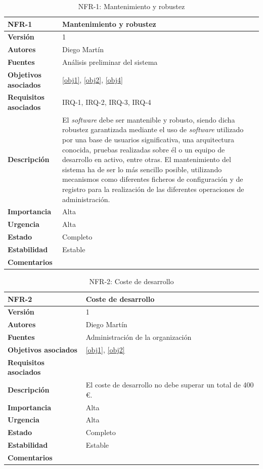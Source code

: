 \begin{table}[H]
\centering
\begin{tabular}{|p{3.5cm}|p{10cm}|}
\hline
\textbf{NFR-1} &Mantenimiento y robustez\\
\hline
\textbf{Versión} &1\\
\hline
\textbf{Autores} & Diego Martín\\
\hline
\textbf{Fuentes} & Análisis preliminar del sistema\\
\hline
\textbf{Objetivos asociados} &\ref{obj1}, \ref{obj2}, \ref{obj4}\\
\hline
\textbf{Requisitos asociados} & IRQ-1, IRQ-2, IRQ-3, IRQ-4\\
\hline
\textbf{Descripción} &El \textit{software} debe ser mantenible y robusto, siendo dicha robustez garantizada mediante el uso de \textit{software} utilizado por una base de usuarios significativa, una arquitectura conocida, pruebas realizadas sobre él o un equipo de desarrollo en activo, entre otras. El mantenimiento del sistema ha de ser lo más sencillo posible, utilizando mecanismos como diferentes ficheros de configuración y de registro para la realización de las diferentes operaciones de administración.\\
\hline
\textbf{Importancia} &Alta\\
\hline
\textbf{Urgencia} &Alta\\
\hline
\textbf{Estado} &Completo\\
\hline
\textbf{Estabilidad} &Estable\\
\hline
\textbf{Comentarios} &\\
\hline
\end{tabular}
\caption{NFR-1: Mantenimiento y robustez}
\end{table}

\begin{table}[H]
\centering
\begin{tabular}{|p{3.5cm}|p{10cm}|}
\hline
\textbf{NFR-2} &Coste de desarrollo\\
\hline
\textbf{Versión} &1\\
\hline
\textbf{Autores} & Diego Martín\\
\hline
\textbf{Fuentes} &Administración de la organización\\
\hline
\textbf{Objetivos asociados} & \ref{obj1}, \ref{obj2}\\
\hline
\textbf{Requisitos asociados} &\\
\hline
\textbf{Descripción} &El coste de desarrollo no debe superar un total de 400 €.\\
\hline
\textbf{Importancia} &Alta\\
\hline
\textbf{Urgencia} &Alta\\
\hline
\textbf{Estado} &Completo\\
\hline
\textbf{Estabilidad} &Estable\\
\hline
\textbf{Comentarios} &\\
\hline
\end{tabular}
\caption{NFR-2: Coste de desarrollo}
\end{table}

